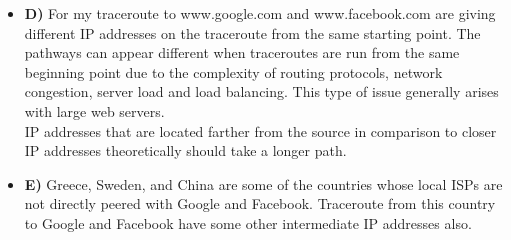 \documentclass{article}
\begin{document}
\begin{itemize}
\item \textbf{D)} For my traceroute to www.google.com and www.facebook.com are giving different IP addresses on the traceroute from the same starting point. The pathways can appear different when traceroutes are run from the same beginning point due to the complexity of routing protocols, network congestion, server load and load balancing. This type of issue generally arises with large web servers.\\ 
IP addresses that are located farther from the source in comparison to closer IP addresses theoretically should take a longer path.
\item \textbf{E)} Greece, Sweden, and China are some of the countries whose local ISPs are not directly peered with Google and Facebook. Traceroute from this country to Google and Facebook have some other intermediate IP addresses also.
\end{itemize}
\end{document}
